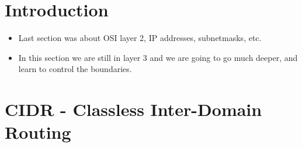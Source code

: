 \section{Introduction}
\begin{itemize}
    \item Last section was about OSI layer 2, IP addresses, subnetmasks, etc.
    \item In this section we are still in layer 3 and we are going to go much deeper, and learn to control the boundaries.
\end{itemize}


\section{CIDR - Classless Inter-Domain Routing}
